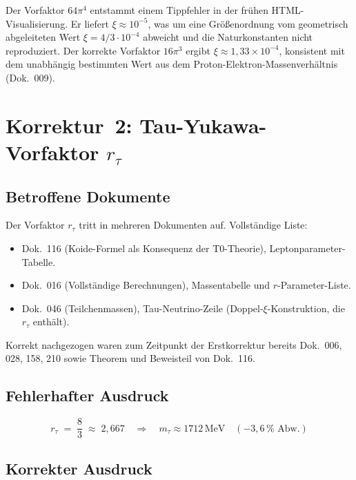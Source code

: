 Der Vorfaktor $64\pi^4$ entstammt einem Tippfehler in der frühen
HTML-Visualisierung. Er liefert $\xi \approx 10^{-5}$, was um eine
Größenordnung vom geometrisch abgeleiteten Wert
$\xi = 4/3 \cdot 10^{-4}$ abweicht und die Naturkonstanten nicht
reproduziert. Der korrekte Vorfaktor $16\pi^3$ ergibt
$\xi \approx 1{,}33 \times 10^{-4}$, konsistent mit dem unabhängig
bestimmten Wert aus dem Proton-Elektron-Massenverhältnis (Dok.~009).

\section{\texorpdfstring{Korrektur~2: Tau-Yukawa-Vorfaktor $r_\tau$}{Korrektur 2: Tau-Yukawa-Vorfaktor r-tau}}

\subsection*{Betroffene Dokumente}

Der Vorfaktor $r_\tau$ tritt in mehreren Dokumenten auf. Vollständige Liste:
\begin{itemize}
  \item Dok.~116 (Koide-Formel als Konsequenz der T0-Theorie),
        Leptonparameter-Tabelle.
  \item Dok.~016 (Vollständige Berechnungen), Massentabelle und
        $r$-Parameter-Liste.
  \item Dok.~046 (Teilchenmassen), Tau-Neutrino-Zeile
        (Doppel-$\xi$-Konstruktion, die $r_\tau$ enthält).
\end{itemize}
Korrekt nachgezogen waren zum Zeitpunkt der Erstkorrektur bereits
Dok.~006, 028, 158, 210 sowie Theorem und Beweisteil von Dok.~116.

\subsection*{Fehlerhafter Ausdruck}

\begin{equation}
  r_\tau \;=\; \frac{8}{3} \;\approx\; 2{,}667
  \quad \Rightarrow \quad
  m_\tau \approx 1712\,\text{MeV} \quad (-3{,}6\,\% \text{ Abw.})
  \tag{alt -- falsch}
\end{equation}

\subsection*{Korrekter Ausdruck}

